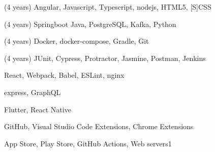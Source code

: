 \faJavascript{}
\begin{cvskills}

  {(4 years) Angular, Javascript, Typescript, nodejs, HTML5, [S]CSS}

  {(4 years) Springboot Java, PostgreSQL, Kafka, Python}

  {(4 years) Docker, docker-compose, Gradle, Git}

  {(4 years) JUnit, Cypress, Protractor, Jasmine, Postman, Jenkins}\\



  {React, Webpack, Babel, ESLint, nginx}

  {express, GraphQL}

  {Flutter, React Native}

  {GitHub, Visual Studio Code Extensions, Chrome Extensions}

  {App Store, Play Store, GitHub Actions, Web servers1}

\end{cvskills}
